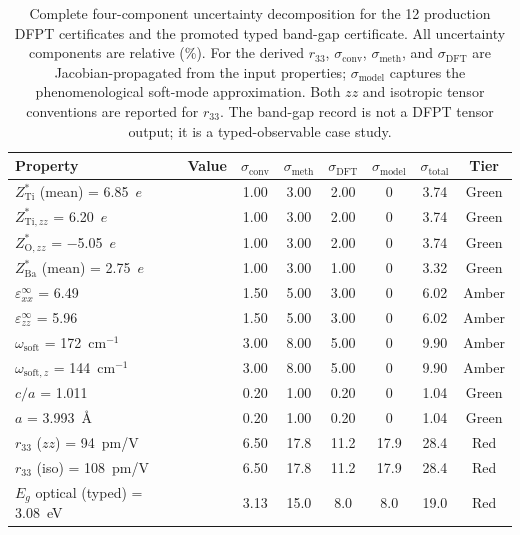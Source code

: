 \documentclass[onecolumn,superscriptaddress,amsmath,amssymb,longbibliography]{revtex4-2}
\newcommand{\conv}{\mathrm{conv}}
\newcommand{\meth}{\mathrm{meth}}
\begin{document}
\begin{table}[ht]
\centering
\footnotesize
\caption{Complete four-component uncertainty decomposition for the 12
production DFPT certificates and the promoted typed band-gap certificate. All
uncertainty components are relative (\%).
For the derived $r_{33}$, $\sigma_\conv$, $\sigma_\meth$, and
$\sigma_{\mathrm{DFT}}$ are Jacobian-propagated from the input
properties; $\sigma_{\mathrm{model}}$ captures the phenomenological
soft-mode approximation. Both $zz$ and isotropic tensor conventions
are reported for $r_{33}$. The band-gap record is not a DFPT tensor output; it
is a typed-observable case study.}
\label{tab:si_certificates}
\begin{tabular}{lccccccc}
\toprule
Property & Value & $\sigma_\conv$ & $\sigma_\meth$ &
$\sigma_{\mathrm{DFT}}$ & $\sigma_{\mathrm{model}}$ &
$\sigma_{\mathrm{total}}$ & Tier \\
\midrule
$Z^*_{\mathrm{Ti}}$ (mean) = 6.85~$e$ & & 1.00 & 3.00 & 2.00 & 0 & 3.74 & Green \\
$Z^*_{\mathrm{Ti},zz}$ = 6.20~$e$ & & 1.00 & 3.00 & 2.00 & 0 & 3.74 & Green \\
$Z^*_{\mathrm{O},zz}$ = $-$5.05~$e$ & & 1.00 & 3.00 & 2.00 & 0 & 3.74 & Green \\
$Z^*_{\mathrm{Ba}}$ (mean) = 2.75~$e$ & & 1.00 & 3.00 & 1.00 & 0 & 3.32 & Green \\
$\varepsilon^\infty_{xx}$ = 6.49 & & 1.50 & 5.00 & 3.00 & 0 & 6.02 & Amber \\
$\varepsilon^\infty_{zz}$ = 5.96 & & 1.50 & 5.00 & 3.00 & 0 & 6.02 & Amber \\
$\omega_{\mathrm{soft}}$ = 172~cm$^{-1}$ & & 3.00 & 8.00 & 5.00 & 0 & 9.90 & Amber \\
$\omega_{\mathrm{soft},z}$ = 144~cm$^{-1}$ & & 3.00 & 8.00 & 5.00 & 0 & 9.90 & Amber \\
$c/a$ = 1.011 & & 0.20 & 1.00 & 0.20 & 0 & 1.04 & Green \\
$a$ = 3.993~\AA & & 0.20 & 1.00 & 0.20 & 0 & 1.04 & Green \\
\midrule
$r_{33}$ ($zz$) = 94~pm/V & & 6.50 & 17.8 & 11.2 & 17.9 & 28.4 & Red \\
$r_{33}$ (iso) = 108~pm/V & & 6.50 & 17.8 & 11.2 & 17.9 & 28.4 & Red \\
\midrule
$E_g$ optical (typed) = 3.08~eV & & 3.13 & 15.0 & 8.0 & 8.0 & 19.0 & Red \\
\bottomrule
\end{tabular}
\end{table}
\end{document}

